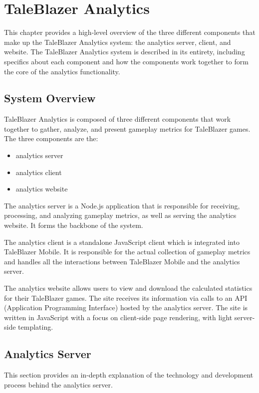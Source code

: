 \chapter{TaleBlazer Analytics}

This chapter provides a high-level overview of the three different components that make up the TaleBlazer Analytics system: the analytics server, client, and website. The TaleBlazer Analytics system is described in its entirety, including specifics about each component and how the components work together to form the core of the analytics functionality. 

\section{System Overview} 

TaleBlazer Analytics is composed of three different components that work together to gather, analyze, and present gameplay metrics for TaleBlazer games. The three components are the:
	\begin{itemize}
		\item analytics server
		\item analytics client
		\item analytics website
	\end{itemize}

The analytics server is a Node.js application that is responsible for receiving, processing, and analyzing gameplay metrics, as well as serving the analytics website. It forms the backbone of the system. 

The analytics client is a standalone JavaScript client which is integrated into TaleBlazer Mobile. It is responsible for the actual collection of gameplay metrics and handles all the interactions between TaleBlazer Mobile and the analytics server. 

The analytics website allows users to view and download the calculated statistics for their TaleBlazer games. The site receives its information via calls to an API (Application Programming Interface) hosted by the analytics server. The site is written in JavaScript with a focus on client-side page rendering, with light server-side templating. 

\section{Analytics Server}

This section provides an in-depth explanation of the technology and development process behind the analytics server.

